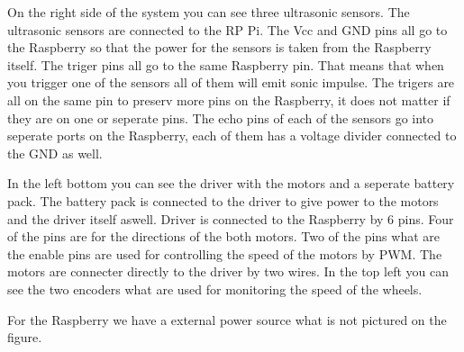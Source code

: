 On the right side of the system you can see three ultrasonic sensors.
The ultrasonic sensors are connected to the RP Pi.
The Vcc and GND pins all go to the Raspberry so that the power for the sensors is taken from the Raspberry itself.
The triger pins all go to the same Raspberry pin.
That means that when you trigger one of the sensors all of them will emit sonic impulse.
The trigers are all on the same pin to preserv more pins on the Raspberry, it does not matter if they are on one or seperate pins.
The echo pins of each of the sensors go into seperate ports on the Raspberry, each of them has a voltage divider connected to the GND as well.

In the left bottom you can see the driver with the motors and a seperate battery pack.
The battery pack is connected to the driver to give power to the motors and the driver itself aswell.
Driver is connected to the Raspberry by 6 pins.
Four of the pins are for the directions of the both motors.
Two of the pins what are the enable pins are used for controlling the speed of the motors by PWM.
The motors are connecter directly to the driver by two wires.
In the top left you can see the two encoders what are used for monitoring the speed of the wheels.

For the Raspberry we have a external power source what is not pictured on the figure.

